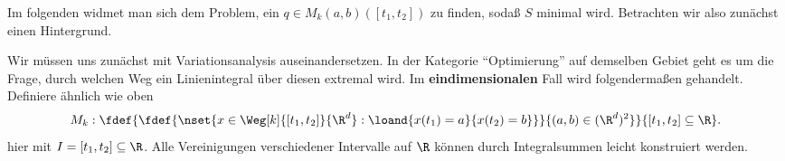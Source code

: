 \documentclass[../WiSe22ANA3.tex]{subfiles}
\begin{document}
	 	Im folgenden widmet man sich dem Problem, ein $q\in M_k(a,b)([t_1,t_2])$ zu finden, sodaß $S$ minimal wird. Betrachten wir also zunächst einen Hintergrund. 
	 	\begin{hintergrund}
 	 		Wir müssen uns zunächst mit Variationsanalysis auseinandersetzen. In der Kategorie \enquote{Optimierung} auf demselben Gebiet geht es um die Frage, durch welchen Weg ein Linienintegral über diesen extremal wird. Im \textbf{eindimensionalen} Fall wird folgendermaßen gehandelt. Definiere ähnlich wie oben
 	 		\begin{align*}
 	 			M_k:\fdef{\fdef{\nset{x\in \Weg[k]{[t_1,t_2]}{\R^d}:\loand{x(t_1)=a}{x(t_2)=b}}}{(a,b)\in(\R^d)^2}}{[t_1,t_2]\subseteq\R}.
 	 		\end{align*}
 	 		hier mit $I=[t_1,t_2]\subseteq\R$. Alle Vereinigungen verschiedener Intervalle auf $\R$ können durch Integralsummen leicht konstruiert werden. \\
 	 		

\end{hintergrund}
\end{document}
